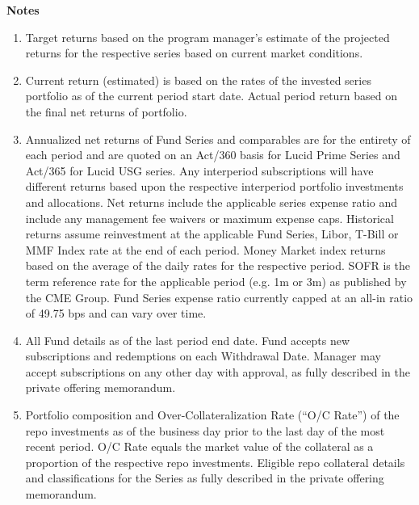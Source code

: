 \documentclass[9pt]{article}
\begin{document}
\onecolumn



\pagebreak 

\footnotesize
\noindent\textbf{\color{lucid_blue}Notes}

\begin{enumerate}
\item Target returns based on the program manager's estimate of the projected returns for the respective series based on current market conditions. 

\item Current return (estimated) is based on the rates of the invested series portfolio as of the current period start date.  Actual period return based on the final net returns of portfolio.   

\item Annualized net returns of Fund Series and comparables are for the entirety of each period and are quoted on an Act/360 basis for Lucid Prime Series and Act/365 for Lucid USG series. Any interperiod subscriptions will have different returns based upon the respective interperiod portfolio investments and allocations. Net returns include the applicable series expense ratio and include any management fee waivers or maximum expense caps. Historical returns assume reinvestment at the applicable Fund Series, Libor, T-Bill or MMF Index rate at the end of each period.  Money Market index returns based on the average of the daily rates for the respective period. SOFR is the term reference rate for the applicable period (e.g. 1m or 3m) as published by the CME Group. Fund Series expense ratio currently capped at an all-in ratio of 49.75 bps and can vary over time.

\item All Fund details as of the last period end date. Fund accepts new subscriptions and redemptions on each Withdrawal Date.  Manager may accept subscriptions on any other day with approval, as fully described in the private offering memorandum.

\item Portfolio composition and Over-Collateralization Rate (``O/C Rate'') of the repo investments as of the business day prior to the last day of the most recent period. O/C Rate equals the market value of the collateral as a proportion of the respective repo investments. Eligible repo collateral details and classifications for the Series as fully described in the private offering memorandum.

\end{enumerate}
\end{document}
